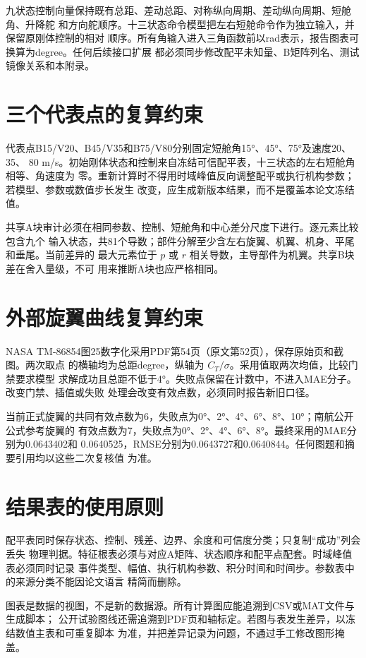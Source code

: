 \documentclass[UTF8,12pt,oneside,openany,fontset=windows]{ctexbook}
\begin{document}
九状态控制向量保持既有总距、差动总距、对称纵向周期、差动纵向周期、短舱角、升降舵 和方向舵顺序。十三状态命令模型把左右短舱命令作为独立输入，并保留原刚体控制的相对 顺序。所有角输入进入三角函数前以rad表示，报告图表可换算为degree。任何后续接口扩展 都必须同步修改配平未知量、B矩阵列名、测试镜像关系和本附录。

\section{三个代表点的复算约束}

代表点B15/V20、B45/V35和B75/V80分别固定短舱角15°、45°、75°及速度20、35、 80 m/s。初始刚体状态和控制来自冻结可信配平表，十三状态的左右短舱角相等、角速度为 零。重新计算时不得用时域峰值反向调整配平或执行机构参数；若模型、参数或数值步长发生 改变，应生成新版本结果，而不是覆盖本论文冻结值。

共享A块审计必须在相同参数、控制、短舱角和中心差分尺度下进行。逐元素比较包含九个 输入状态，共81个导数；部件分解至少含左右旋翼、机翼、机身、平尾和垂尾。当前差异的 最大元素位于 \(p\) 或 \(r\) 相关导数，主导部件为机翼。共享B块差在舍入量级，不可 用来推断A块也应严格相同。

\section{外部旋翼曲线复算约束}

NASA TM-86854图25数字化采用PDF第54页（原文第52页），保存原始页和截图。两次取点 的横轴均为总距degree，纵轴为 \(C_T/\sigma\)。采用值取两次均值，比较门禁要求模型 求解成功且总距不低于4°。失败点保留在计数中，不进入MAE分子。改变门禁、插值或失败 处理会改变有效点数，必须同时报告新旧口径。

当前正式旋翼的共同有效点数为6，失败点为0°、2°、4°、6°、8°、10°；南航公开公式参考旋翼的 有效点数为7，失败点为0°、2°、4°、6°、8°。最终采用的MAE分别为0.0643402和 0.0640525，RMSE分别为0.0643727和0.0640844。任何图题和摘要引用均以这些二次复核值 为准。

\section{结果表的使用原则}

配平表同时保存状态、控制、残差、边界、余度和可信度分类；只复制“成功”列会丢失 物理判据。特征根表必须与对应A矩阵、状态顺序和配平点配套。时域峰值表必须同时记录 事件类型、幅值、执行机构参数、积分时间和时间步。参数表中的来源分类不能因论文语言 精简而删除。

图表是数据的视图，不是新的数据源。所有计算图应能追溯到CSV或MAT文件与生成脚本； 公开试验图线还需追溯到PDF页和轴标定。若图与表发生差异，以冻结数值主表和可重复脚本 为准，并把差异记录为问题，不通过手工修改图形掩盖。
\end{document}
